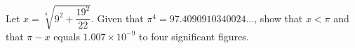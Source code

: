 Let $x=\sqrt[4]{9^2+\dfrac{19^2}{22}}$. Given that $\pi^4=97.4090910340024\ldots$, show that $x<\pi$ and that $\pi-x$ equals $1.007\times10^{-9}$ to four significant figures.
